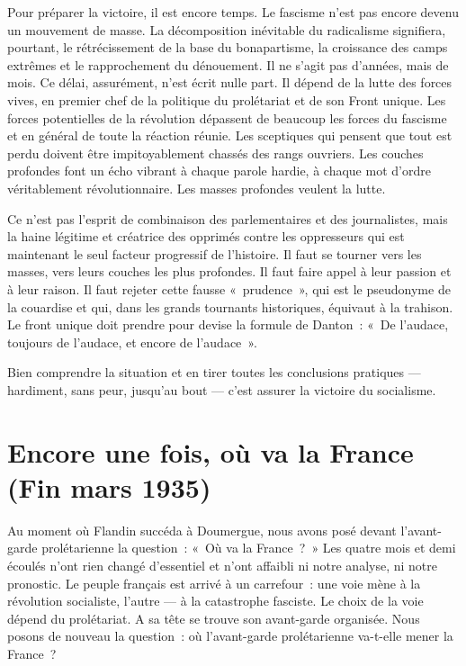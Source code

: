\documentclass[french,twoside]{book} %
\newcommand\chapteropen{} %
\newcommand\chaptercont{} %
\newcommand\chapterclose{} %
\begin{document}
Pour préparer la victoire, il est encore temps. Le fascisme n’est pas encore devenu un mouvement de masse. La décomposition inévitable du radicalisme signifiera, pourtant, le rétrécissement de la base du bonapartisme, la croissance des camps extrêmes et le rapprochement du dénouement. Il ne s’agit pas d’années, mais de mois. Ce délai, assurément, n’est écrit nulle part. Il dépend de la lutte des forces vives, en premier chef de la politique du prolétariat et de son Front unique. Les forces potentielles de la révolution dépassent de beaucoup les forces du fascisme et en général de toute la réaction réunie. Les sceptiques qui pensent que tout est perdu doivent être  impitoyablement chassés des rangs ouvriers. Les couches profondes font un écho vibrant à chaque parole hardie, à chaque mot d’ordre véritablement révolutionnaire. Les masses profondes veulent la lutte.\par
Ce n’est pas l’esprit de combinaison des parlementaires et des journalistes, mais la haine légitime et créatrice des opprimés contre les oppresseurs qui est maintenant le seul facteur progressif de l’histoire. Il faut se tourner vers les masses, vers leurs couches les plus profondes. Il faut faire appel à leur passion et à leur raison. Il faut rejeter cette fausse « prudence », qui est le pseudonyme de la couardise et qui, dans les grands tournants historiques, équivaut à la trahison. Le front unique doit prendre pour devise la formule de Danton : « De l’audace, toujours de l’audace, et encore de l’audace ».\par
Bien comprendre la situation et en tirer toutes les conclusions pratiques — hardiment, sans peur, jusqu’au bout — c’est assurer la victoire du socialisme.
\chapterclose


\chapteropen
 \chapter[{Encore une fois, où va la France. (Fin mars 1935)}]{Encore une fois, où va la France \\
 (Fin mars 1935)}
\label{p3}\renewcommand{\leftmark}{Encore une fois, où va la France \\
 (Fin mars 1935)}


\chaptercont
\noindent Au moment où Flandin succéda à Doumergue, nous avons posé devant l’avant-garde prolétarienne la question : « Où va la France ? » Les quatre mois et demi écoulés n’ont rien changé d’essentiel et n’ont affaibli ni notre analyse, ni notre pronostic. Le peuple français est arrivé à un carrefour : une voie mène à la révolution socialiste, l’autre — à la catastrophe fasciste. Le choix de la voie dépend du prolétariat. A sa tête se trouve son avant-garde organisée. Nous posons de nouveau la question : où l’avant-garde prolétarienne va-t-elle mener la France ?\par
\end{document}
